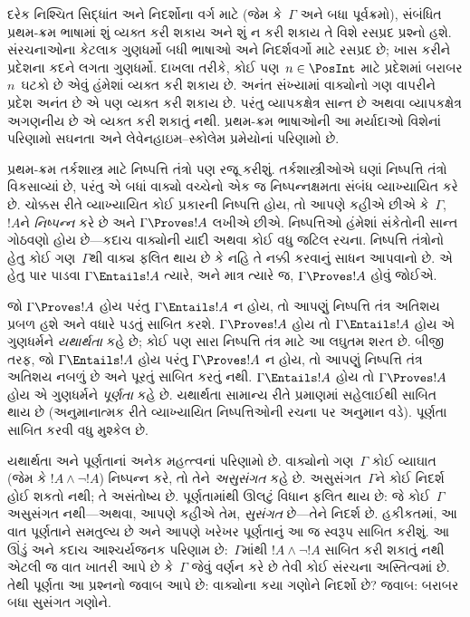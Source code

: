 દરેક નિશ્ચિત સિદ્ધાંત અને નિદર્શોના વર્ગ માટે (જેમ કે~$\Gamma$ અને
બધા પૂર્વક્રમો), સંબંધિત પ્રથમ-ક્રમ ભાષામાં શું વ્યક્ત કરી શકાય અને
શું ન કરી શકાય તે વિશે રસપ્રદ પ્રશ્નો હશે. સંરચનાઓના કેટલાક
ગુણધર્મો બધી ભાષાઓ અને નિદર્શવર્ગો માટે રસપ્રદ છે; ખાસ કરીને
પ્રદેશના કદને લગતા ગુણધર્મો. દાખલા તરીકે, કોઈ પણ~$n \in \PosInt$
માટે પ્રદેશમાં બરાબર $n$~ઘટકો છે એવું હંમેશાં વ્યક્ત કરી
શકાય છે. અનંત સંખ્યામાં વાક્યોનો ગણ વાપરીને પ્રદેશ અનંત
છે એ પણ વ્યક્ત કરી શકાય છે. પરંતુ વ્યાપકક્ષેત્ર સાન્ત છે અથવા
વ્યાપકક્ષેત્ર અગણનીય છે એ વ્યક્ત કરી શકાતું નથી.
પ્રથમ-ક્રમ ભાષાઓની આ મર્યાદાઓ વિશેનાં પરિણામો સઘનતા અને
લેવેનહાઇમ--સ્કોલેમ પ્રમેયોનાં પરિણામો છે.
\endgroup


\begingroup
\makeatletter{}\makeatother


\label{guunit:OLP-0148}


પ્રથમ-ક્રમ તર્કશાસ્ત્ર માટે નિષ્પત્તિ તંત્રો પણ રજૂ કરીશું.
તર્કશાસ્ત્રીઓએ ઘણાં નિષ્પત્તિ તંત્રો વિકસાવ્યાં છે, પરંતુ એ બધાં
વાક્યો વચ્ચેનો એક જ નિષ્પન્નક્ષમતા સંબંધ વ્યાખ્યાયિત કરે છે.
ચોક્કસ રીતે વ્યાખ્યાયિત કોઈ પ્રકારની નિષ્પત્તિ હોય, તો આપણે
કહીએ છીએ કે~$\Gamma$,~$!A$ને \emph{નિષ્પન્ન} કરે છે અને
$\Gamma \Proves !A$ લખીએ છીએ. નિષ્પત્તિઓ હંમેશાં સંકેતોની
સાન્ત ગોઠવણો હોય છે---કદાચ વાક્યોની યાદી અથવા કોઈ વધુ જટિલ
રચના. નિષ્પત્તિ તંત્રોનો હેતુ કોઈ ગણ~$\Gamma$થી વાક્ય
ફલિત થાય છે કે નહિ તે નક્કી કરવાનું સાધન આપવાનો છે. એ હેતુ પાર પાડવા
$\Gamma \Entails !A$ ત્યારે, અને માત્ર ત્યારે જ, $\Gamma \Proves !A$
હોવું જોઈએ.

જો $\Gamma \Proves !A$ હોય પરંતુ $\Gamma \Entails !A$ ન હોય, તો
આપણું નિષ્પત્તિ તંત્ર અતિશય પ્રબળ હશે અને વધારે પડતું સાબિત કરશે.
$\Gamma \Proves !A$ હોય તો $\Gamma \Entails !A$ હોય એ ગુણધર્મને
\emph{યથાર્થતા} કહે છે; કોઈ પણ સારા નિષ્પત્તિ તંત્ર માટે આ લઘુતમ
શરત છે. બીજી તરફ, જો $\Gamma \Entails !A$ હોય પરંતુ $\Gamma \Proves
!A$ ન હોય, તો આપણું નિષ્પત્તિ તંત્ર અતિશય નબળું છે અને પૂરતું
સાબિત કરતું નથી. $\Gamma \Entails !A$ હોય તો $\Gamma \Proves !A$
હોય એ ગુણધર્મને \emph{પૂર્ણતા} કહે છે. યથાર્થતા સામાન્ય રીતે પ્રમાણમાં
સહેલાઈથી સાબિત થાય છે (અનુમાનાત્મક રીતે વ્યાખ્યાયિત
નિષ્પત્તિઓની રચના પર અનુમાન વડે). પૂર્ણતા સાબિત કરવી વધુ મુશ્કેલ
છે.

યથાર્થતા અને પૂર્ણતાનાં અનેક મહત્ત્વનાં પરિણામો છે. વાક્યોનો
ગણ~$\Gamma$ કોઈ વ્યાઘાત (જેમ કે $!A \land \lnot !A$) નિષ્પન્ન કરે,
તો તેને \emph{અસુસંગત} કહે છે. અસુસંગત~$\Gamma$ને કોઈ નિદર્શ હોઈ
શકતો નથી; તે અસંતોષ્ય છે. પૂર્ણતામાંથી ઊલટું વિધાન ફલિત થાય છે: જે
કોઈ~$\Gamma$ અસુસંગત નથી---અથવા, આપણે કહીએ તેમ,
\emph{સુસંગત} છે---તેને નિદર્શ છે. હકીકતમાં, આ વાત પૂર્ણતાને સમતુલ્ય
છે અને આપણે ખરેખર પૂર્ણતાનું આ જ સ્વરૂપ સાબિત કરીશું. આ ઊંડું અને
કદાચ આશ્ચર્યજનક પરિણામ છે:~$\Gamma$માંથી $!A \land \lnot !A$ સાબિત
કરી શકાતું નથી એટલી જ વાત ખાતરી આપે છે કે~$\Gamma$ જેવું વર્ણન કરે
છે તેવી કોઈ સંરચના અસ્તિત્વમાં છે. તેથી પૂર્ણતા આ પ્રશ્નનો
જવાબ આપે છે: વાક્યોના કયા ગણોને નિદર્શો છે? જવાબ: બરાબર બધા
સુસંગત ગણોને.

